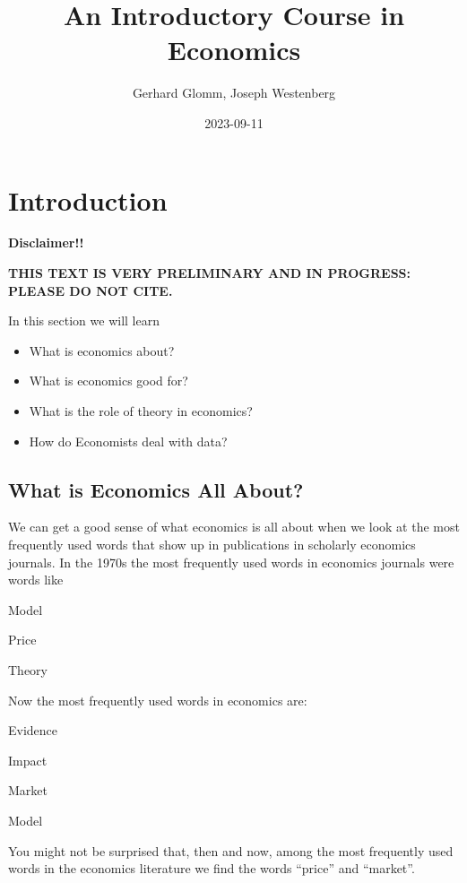 \documentclass[
]{book}
\title{An Introductory Course in Economics}
\author{Gerhard Glomm, Joseph Westenberg}
\date{2023-09-11}
\providecommand{\tightlist}{%
  \setlength{\itemsep}{0pt}\setlength{\parskip}{0pt}}
\begin{document}
\maketitle

{
\setcounter{tocdepth}{1}
\tableofcontents
}
\hypertarget{intro}{%
\chapter{Introduction}\label{intro}}

\textbf{Disclaimer!!}

\textbf{THIS TEXT IS VERY PRELIMINARY AND IN PROGRESS: PLEASE DO NOT CITE.}

In this section we will learn

\begin{itemize}
\tightlist
\item
  What is economics about?
\item
  What is economics good for?
\item
  What is the role of theory in economics?
\item
  How do Economists deal with data?
\end{itemize}

\hypertarget{what-is-economics-all-about}{%
\section{What is Economics All About?}\label{what-is-economics-all-about}}

We can get a good sense of what economics is all about when we look at the most frequently used words that show up in publications in scholarly economics journals. In the 1970s the most frequently used words in economics journals were words like

\begin{center}
Model

Price

Theory

\end{center}

Now the most frequently used words in economics are:

\begin{center}
Evidence

Impact

Market

Model

\end{center}

You might not be surprised that, then and now, among the most frequently used words in the economics literature we find the words ``price'' and ``market''.
\end{document}

